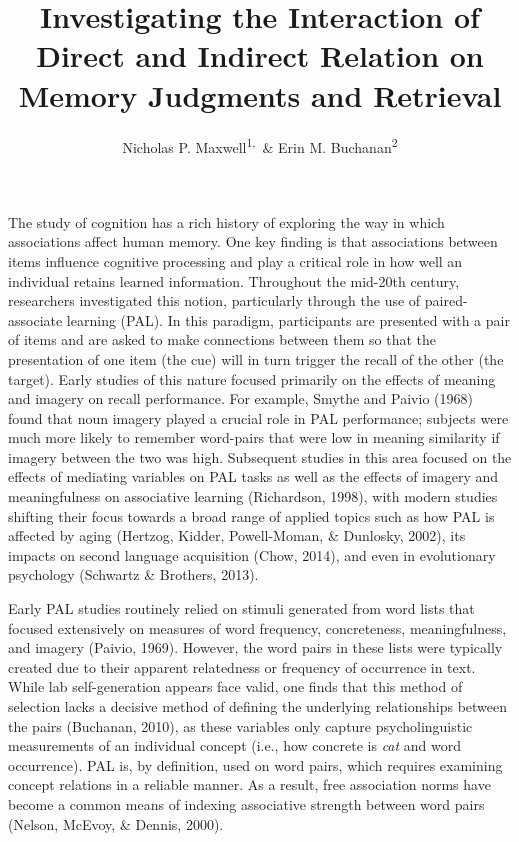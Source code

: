 \documentclass[english,,man]{apa6}
\title{Investigating the Interaction of Direct and Indirect Relation on Memory Judgments and Retrieval}
\author{Nicholas P. Maxwell\textsuperscript{1,}~\& Erin M. Buchanan\textsuperscript{2}}
\date{}
\affiliation{
\vspace{0.5cm}
\textsuperscript{1} University of Southern Mississippi\\\textsuperscript{2} Harrisburg University of Science and Technology}
\begin{document}
\maketitle

The study of cognition has a rich history of exploring the way in which associations affect human memory. One key finding is that associations between items influence cognitive processing and play a critical role in how well an individual retains learned information. Throughout the mid-20th century, researchers investigated this notion, particularly through the use of paired-associate learning (PAL). In this paradigm, participants are presented with a pair of items and are asked to make connections between them so that the presentation of one item (the cue) will in turn trigger the recall of the other (the target). Early studies of this nature focused primarily on the effects of meaning and imagery on recall performance. For example, Smythe and Paivio (1968) found that noun imagery played a crucial role in PAL performance; subjects were much more likely to remember word-pairs that were low in meaning similarity if imagery between the two was high. Subsequent studies in this area focused on the effects of mediating variables on PAL tasks as well as the effects of imagery and meaningfulness on associative learning (Richardson, 1998), with modern studies shifting their focus towards a broad range of applied topics such as how PAL is affected by aging (Hertzog, Kidder, Powell-Moman, \& Dunlosky, 2002), its impacts on second language acquisition (Chow, 2014), and even in evolutionary psychology (Schwartz \& Brothers, 2013).

Early PAL studies routinely relied on stimuli generated from word lists that focused extensively on measures of word frequency, concreteness, meaningfulness, and imagery (Paivio, 1969). However, the word pairs in these lists were typically created due to their apparent relatedness or frequency of occurrence in text. While lab self-generation appears face valid, one finds that this method of selection lacks a decisive method of defining the underlying relationships between the pairs (Buchanan, 2010), as these variables only capture psycholinguistic measurements of an individual concept (i.e., how concrete is \emph{cat} and word occurrence). PAL is, by definition, used on word pairs, which requires examining concept relations in a reliable manner. As a result, free association norms have become a common means of indexing associative strength between word pairs (Nelson, McEvoy, \& Dennis, 2000).
\end{document}
